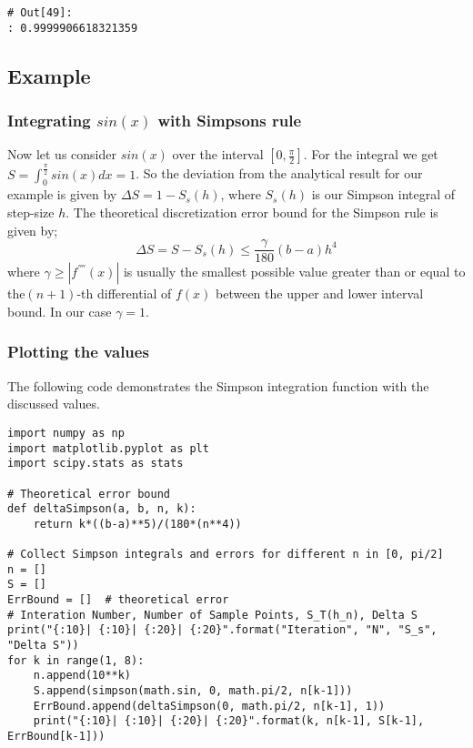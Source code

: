 \documentclass[11pt]{article}
\begin{document}
\begin{verbatim}
# Out[49]:
: 0.9999906618321359
\end{verbatim}

\subsection{Example}
\label{sec:orgd9b5645}
\subsubsection{Integrating \(sin(x)\) with Simpsons rule}
\label{sec:org1f589fa}
Now let us consider \(sin(x)\) over the interval \([0, \frac{\pi}{2}]\). 
For the integral we get \(S = \int_{0}^{\frac{\pi}{2}} sin(x) dx = 1\). 
So the deviation from the analytical result for our example is given by \(\Delta S = 1 - S_s(h)\), 
where \(S_s(h)\) is our Simpson integral of step-size \(h\). 
The theoretical discretization error bound for the Simpson rule is given by;
\begin{equation}
\Delta S = S-S_s(h) \leq \frac{\gamma}{180}(b-a)h^4
\end{equation}
where \(\gamma \geq |f^{''''}(x)|\) is usually the smallest possible value
greater than or equal to the\((n+1)\)-th differential of \(f(x)\) between the upper and lower interval bound. 
In our case \(\gamma = 1\).

\subsubsection{Plotting the values}
\label{sec:org50eb6fb}

The following code demonstrates the Simpson integration function with the discussed values.

\begin{verbatim}
import numpy as np
import matplotlib.pyplot as plt
import scipy.stats as stats

# Theoretical error bound
def deltaSimpson(a, b, n, k):
    return k*((b-a)**5)/(180*(n**4))

# Collect Simpson integrals and errors for different n in [0, pi/2]
n = []
S = [] 
ErrBound = []  # theoretical error
# Interation Number, Number of Sample Points, S_T(h_n), Delta S 
print("{:10}| {:10}| {:20}| {:20}".format("Iteration", "N", "S_s", "Delta S"))
for k in range(1, 8):
    n.append(10**k)
    S.append(simpson(math.sin, 0, math.pi/2, n[k-1]))
    ErrBound.append(deltaSimpson(0, math.pi/2, n[k-1], 1))
    print("{:10}| {:10}| {:20}| {:20}".format(k, n[k-1], S[k-1], ErrBound[k-1]))


\end{verbatim}
\end{document}
